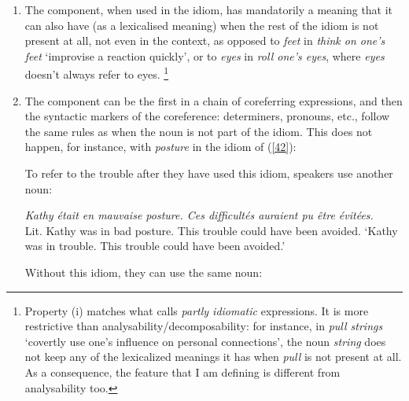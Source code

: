 \documentclass[output=paper]{langsci/langscibook}
\begin{document}
\renewcommand{\theenumi}{(\roman{enumi})}%
\begin{enumerate}
\item The component, when used in the idiom, has mandatorily a meaning that it can also have (as a lexicalised meaning) when the rest of the idiom is not present at all, not even in the context, as opposed to \textit{feet} in \textit{think on one’s feet} ‘improvise a reaction quickly’, or to \textit{eyes} in \textit{roll one’s eyes}, where\textit{ eyes} doesn’t always refer to eyes. \footnote{Property (i) matches what \citet[96]{Burger2007} calls \textit{partly idiomatic} expressions. It is more restrictive than analysability\slash decomposability: for instance, in \textit{pull strings} ‘covertly use one’s influence on personal connections’, the noun \textit{string} does not keep any of the lexicalized meanings it has when \textit{pull} is not present at all. As a consequence, the feature that I am defining is different from analysability 
too.}

\item The component can be the first in a chain of coreferring expressions, and then the syntactic markers of the coreference: determiners, pronouns, etc., follow the same rules as when the noun is not part of the idiom. This does not happen, for instance, with \textit{posture} in the  idiom of (\ref{42}):

\begin{exe}
\end{exe}

To refer to the trouble after they have used this idiom, speakers use another noun:

\begin{exe}
\ex \label{43}
\textit{Kathy était en mauvaise posture. Ces difficultés auraient pu être évitées.}\\
Lit. Kathy was in bad posture. This trouble  could have  been avoided.\hspace*{-2mm}
\glt ‘Kathy was in trouble. This trouble could have been avoided.’
\end{exe}
  
Without this idiom, they can use the same noun:

\begin{exe}
\end{exe}


\end{enumerate}
\end{document}

